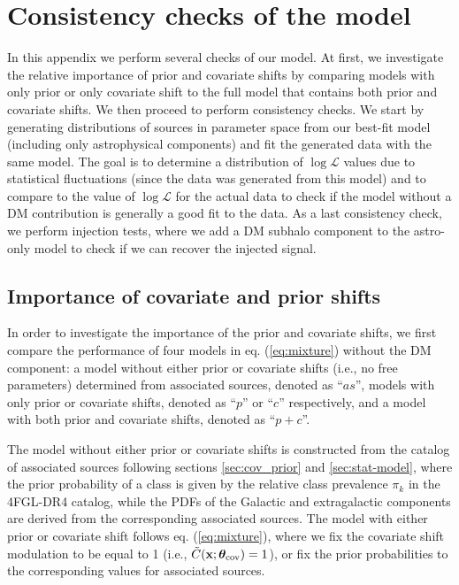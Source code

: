 \section{Consistency checks of the model}
\label{app:MC}


In this appendix we perform several checks of our model.
At first, we investigate the relative importance of prior and covariate shifts by comparing models with only prior or only covariate shift to the full model that contains both prior and covariate shifts. 
We then proceed to perform consistency checks. We start by generating distributions of sources in parameter space from our best-fit model (including only astrophysical components) and fit the generated data with the same model.
The goal is to determine a distribution of $\log\mathcal{L}$ values due to statistical fluctuations (since the data was generated from this model) and to compare to the value of $\log\mathcal{L}$ for the actual data to check if the model without a DM contribution is generally a good fit to the data.
As a last consistency check, we perform injection tests, where we add a DM subhalo component to the astro-only model to check if we can recover the injected signal.

\subsection{Importance of covariate and prior shifts}
\label{app:prior_vs_cov}

In order to investigate the importance of the prior and covariate shifts, 
we first compare the performance of four models in eq. (\ref{eq:mixture}) without the DM component: a model without either prior or covariate shifts (i.e., no free parameters) determined from associated sources, denoted as ``$as$'', models with only prior or covariate shifts, denoted as ``$p$'' or ``$c$'' respectively, and a model with both prior and covariate shifts, denoted as ``$p+c$''. 

The model without either prior or covariate shifts is constructed from the catalog of associated sources following sections \ref{sec:cov_prior} and \ref{sec:stat-model}, where the prior probability of a class is given by the relative class prevalence $\pi_k$ in the 4FGL-DR4 catalog, while the PDFs of the Galactic and extragalactic components are derived from the corresponding associated sources.
The model with either prior or covariate shift follows eq. (\ref{eq:mixture}), 
where we fix the covariate shift modulation to be equal to 1 (i.e., $\tilde{C}(\textbf{x}; \boldsymbol{\theta}_{\rm cov}) = 1$), or fix the prior probabilities to the corresponding values for associated sources.


